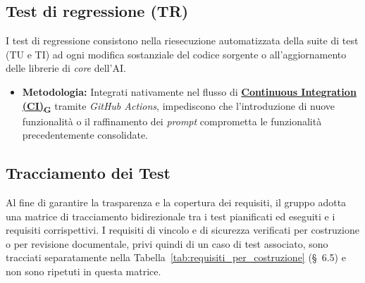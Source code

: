 \documentclass[12pt, a4paper]{article}
\newcommand{\urlglossario}{https://skynetunigroup.github.io/Code_Guardian/Documentazione/PB/glossario_v2.0.0.pdf} %
\newcommand{\glo}[2]{\href{\urlglossario\#nameddest=#2}{#1\textsubscript{G}}}
\begin{document}
\subsection{Test di regressione (TR)}
I test di regressione consistono nella riesecuzione automatizzata della suite di test (TU e TI) ad ogni modifica sostanziale del codice sorgente o all'aggiornamento delle librerie di \textit{core} dell'AI.

\begin{itemize}
    \item \textbf{Metodologia:} Integrati nativamente nel flusso di \textbf{\glo{Continuous Integration (CI)}{continuous-integration}} tramite \textit{GitHub Actions}, impediscono che l'introduzione di nuove funzionalità o il raffinamento dei \textit{prompt} comprometta le funzionalità precedentemente consolidate.
\end{itemize}

\subsection{Tracciamento dei Test}
Al fine di garantire la trasparenza e la copertura dei requisiti, il gruppo adotta una matrice di tracciamento bidirezionale tra i test pianificati ed eseguiti e i requisiti corrispettivi. I requisiti di vincolo e di sicurezza verificati per costruzione o per revisione documentale, privi quindi di un caso di test associato, sono tracciati separatamente nella Tabella~\ref{tab:requisiti_per_costruzione} (\S~6.5) e non sono ripetuti in questa matrice.
\end{document}
